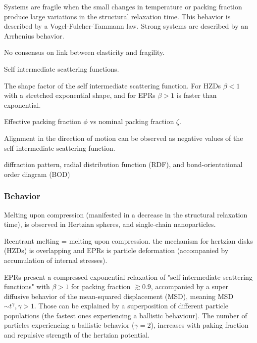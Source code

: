 \documentclass[11pt]{article}
\begin{document}
Systems are fragile when the small changes in temperature or packing fraction produce large variations in the structural relaxation time.\autocite{Gnan.2019} This behavior is described by a Vogel-Fulcher-Tammann law.\autocite{Princen.1983} Strong systems are described by an Arrhenius behavior.\autocite{Gnan.2019} 

No consensus on link between elasticity and fragility. 

Self intermediate scattering functions.\autocite{Gnan.2019}

The shape factor of the self intermediate scattering function.\autocite{Gnan.2019} For HZDs $\beta < 1$ with a stretched exponential shape, and for EPRs $\beta > 1$ is faster than exponential.

Effective packing fraction $\phi$ vs nominal packing fraction $\zeta$.\autocite{Gnan.2019}

Alignment in the direction of motion can be observed as negative values of the self intermediate scattering function.\autocite{Gnan.2019}

diffraction pattern, radial distribution function (RDF), and bond-orientational order diagram (BOD)\autocite{Marson.2019}



\subsubsection{Behavior}
Melting upon compression (manifested in a decrease in the structural relaxation time),\autocite{Gnan.2019} is observed in Hertzian spheres,\autocite{Berthier.2010} and single-chain nanoparticles.\autocite{LoVerso.2016}

Reentrant melting = melting upon compression.\autocite{Gnan.2019} the mechanism for hertzian disks (HZDs) is overlapping and EPRs is particle deformation (accompanied by accumulation of internal stresses).

EPRs present a compressed exponential relaxation of "self intermediate scattering functions" with $\beta > 1$ for packing fraction $\gtrsim 0.9$, accompanied by a super diffusive behavior of the mean-squared displacement (MSD), meaning MSD $\sim t^\gamma ,\gamma>1$.\autocite{Gnan.2019} Those can be explained by a superposition of different particle populations (the fastest ones experiencing a ballistic behaviour). The number of particles experiencing a ballistic behavior ($\gamma = 2$), increases with paking fraction and repulsive strength of the hertzian potential.
\end{document}
